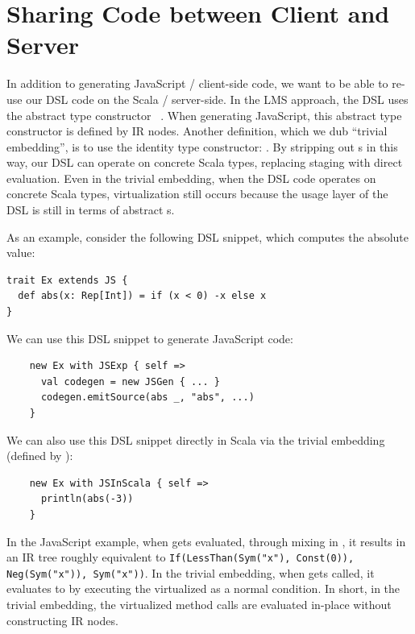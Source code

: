 \documentclass[runningheads,a4paper]{llncs}
\begin{document}
\section{Sharing Code between Client and Server}\label{sec:trivial-embedding} %
In addition to generating JavaScript / client-side code, we want to be able to re-use our DSL code on the Scala / server-side. In the LMS approach, the DSL uses the abstract type constructor ~\cite{higher-kind}. When generating JavaScript, this abstract type constructor is defined by IR nodes. Another definition, which we dub ``trivial embedding'', is to use the identity type constructor: . By stripping out s in this way, our DSL can operate on concrete Scala types, replacing staging with direct evaluation. Even in the trivial embedding, when the DSL code operates on concrete Scala types, virtualization still occurs because the usage layer of the DSL is still in terms of abstract s.

As an example, consider the following DSL snippet, which computes the absolute value:
\begin{lstlisting}
trait Ex extends JS {
  def abs(x: Rep[Int]) = if (x < 0) -x else x
}
\end{lstlisting}
We can use this DSL snippet to generate JavaScript code:
\begin{lstlisting}
    new Ex with JSExp { self =>
      val codegen = new JSGen { ... }
      codegen.emitSource(abs _, "abs", ...)
    }
\end{lstlisting}

We can also use this DSL snippet directly in Scala via the trivial embedding (defined by ):
\begin{lstlisting}
    new Ex with JSInScala { self =>
      println(abs(-3))
    }
\end{lstlisting}

In the JavaScript example, when  gets evaluated, through mixing in , it results in an IR tree roughly equivalent to {\tt\small If(LessThan(Sym("x"), Const(0)), Neg(Sym("x")), Sym("x"))}. In the trivial embedding, when  gets called, it evaluates to  by executing the virtualized  as a normal condition. In short, in the trivial embedding, the virtualized method calls are evaluated in-place without constructing IR nodes.
\end{document}
